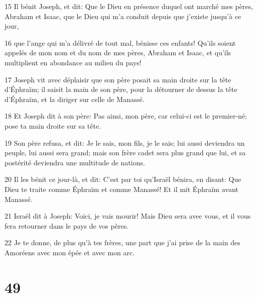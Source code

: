 \par 15 Il bénit Joseph, et dit: Que le Dieu en présence duquel ont marché mes pères, Abraham et Isaac, que le Dieu qui m'a conduit depuis que j'existe jusqu'à ce jour,
\par 16 que l'ange qui m'a délivré de tout mal, bénisse ces enfants! Qu'ils soient appelés de mon nom et du nom de mes pères, Abraham et Isaac, et qu'ils multiplient en abondance au milieu du pays!
\par 17 Joseph vit avec déplaisir que son père posait sa main droite sur la tête d'Éphraïm; il saisit la main de son père, pour la détourner de dessus la tête d'Éphraïm, et la diriger sur celle de Manassé.
\par 18 Et Joseph dit à son père: Pas ainsi, mon père, car celui-ci est le premier-né; pose ta main droite sur sa tête.
\par 19 Son père refusa, et dit: Je le sais, mon fils, je le sais; lui aussi deviendra un peuple, lui aussi sera grand; mais son frère cadet sera plus grand que lui, et sa postérité deviendra une multitude de nations.
\par 20 Il les bénit ce jour-là, et dit: C'est par toi qu'Israël bénira, en disant: Que Dieu te traite comme Éphraïm et comme Manassé! Et il mit Éphraïm avant Manassé.
\par 21 Israël dit à Joseph: Voici, je vais mourir! Mais Dieu sera avec vous, et il vous fera retourner dans le pays de vos pères.
\par 22 Je te donne, de plus qu'à tes frères, une part que j'ai prise de la main des Amoréens avec mon épée et avec mon arc.

\chapter{49}

